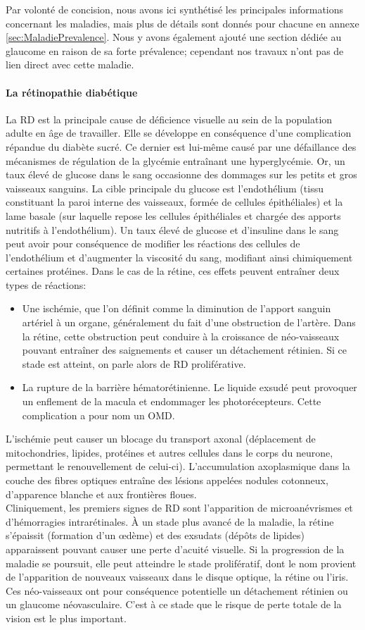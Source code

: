 Par volonté de concision, nous avons ici synthétisé les principales informations concernant les maladies, mais plus de détails sont donnés pour chacune en annexe \ref{sec:MaladiePrevalence}. Nous y avons également ajouté une section dédiée au glaucome en raison de sa forte prévalence; cependant nos travaux n'ont pas de lien direct avec cette maladie.
\paragraph{La rétinopathie diabétique}
La \ac{RD} est la principale cause de déficience visuelle au sein de la population adulte en âge de travailler. 
Elle se développe en conséquence d'une complication répandue du diabète sucré. Ce dernier est lui-même causé par une défaillance des mécanismes de régulation de la glycémie entraînant une hyperglycémie. Or, un taux élevé de glucose dans le sang occasionne des dommages sur les petits et gros vaisseaux sanguins. La cible principale du glucose est l'endothélium (tissu constituant la paroi interne des vaisseaux, formée de cellules épithéliales) et la lame basale (sur laquelle repose les cellules épithéliales et chargée des apports nutritifs à l'endothélium). Un taux élevé de glucose et d'insuline dans le sang peut avoir pour conséquence de modifier les réactions des cellules de l'endothélium et d'augmenter la viscosité du sang, modifiant ainsi chimiquement certaines protéines. Dans le cas de la rétine, ces effets peuvent entraîner deux types de réactions:
\begin{itemize}
	\item Une ischémie, que l'on définit comme la diminution de l'apport sanguin artériel à un organe, généralement du fait d'une obstruction de l'artère. Dans la rétine, cette obstruction peut conduire à la croissance de néo-vaisseaux pouvant entraîner des saignements et causer un détachement rétinien. Si ce stade est atteint, on parle alors de \ac{RD} proliférative.
	\item La rupture de la barrière hématorétinienne. Le liquide exsudé peut provoquer un enflement de la macula et endommager les photorécepteurs. Cette complication a pour nom un \ac{OMD}.
\end{itemize}
L'ischémie peut causer un blocage du transport axonal (déplacement de mitochondries, lipides, protéines et autres cellules dans le corps du neurone, permettant le renouvellement de celui-ci). L'accumulation axoplasmique dans la couche des fibres optiques entraîne des lésions appelées nodules cotonneux, d'apparence blanche et aux frontières floues. \\
Cliniquement, les premiers signes de \ac{RD} sont l'apparition de microanévrismes et d'hémorragies intrarétinales. À un stade plus avancé de la maladie, la rétine s'épaissit (formation d'un \oe{}dème) et des exsudats (dépôts de lipides) apparaissent pouvant causer une perte d'acuité visuelle. Si la progression de la maladie se poursuit, elle peut atteindre le stade prolifératif, dont le nom provient de l'apparition de nouveaux vaisseaux dans le disque optique, la rétine ou l'iris. Ces néo-vaisseaux ont pour conséquence potentielle un détachement rétinien ou un glaucome néovasculaire. C'est à ce stade que le risque de perte totale de la vision est le plus important.

